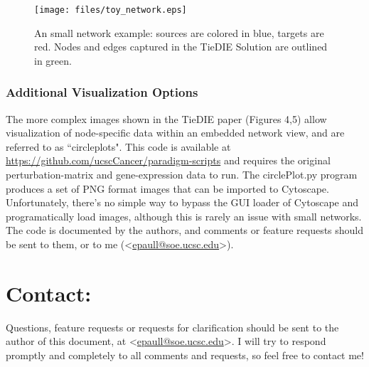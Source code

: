 \documentclass[11pt]{report}
\newcommand{\emailaddr}[1]{\textless\url{#1}\textgreater}
\begin{document}
\begin{figure}[h]
    \texttt{[image: files/toy\_network.eps]}
	\caption{An small network example: sources are colored in blue, targets are red. Nodes and edges captured in the TieDIE Solution are outlined in green.}
    \label{fig:toy_network}
\end{figure}

\clearpage

\subsection{Additional Visualization Options}

The more complex images shown in the TieDIE paper (Figures 4,5) allow visualization of node-specific data within an embedded network view, 
and are referred to as ``circleplots". 
This code is available at \url{https://github.com/ucscCancer/paradigm-scripts} and requires the original perturbation-matrix and gene-expression data to run. The circlePlot.py program produces a set of PNG format images that can be imported to Cytoscape. Unfortunately, there's no simple way to bypass the GUI loader of Cytoscape and programatically load images, although this is rarely an issue with small networks. The code is documented by the authors, and comments or feature requests should be sent to them, or to me (\emailaddr{epaull@soe.ucsc.edu}). 

\chapter{Contact:}

Questions, feature requests or requests for clarification should be sent to the author of this document, at \emailaddr{epaull@soe.ucsc.edu}. I will try to respond promptly and completely to all comments and requests, so feel free to contact me!
 

\end{document}
